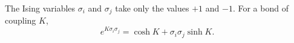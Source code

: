 \documentclass{article}
\begin{document}
The Ising variables $\sigma_i$ and $\sigma_j$ take only the values $+1$ and $-1$. For a bond of coupling $K$,
\begin{equation}
e^{K\sigma_i\sigma_j} = \cosh K + \sigma_i\sigma_j \sinh K .
\label{eq:ht}
\end{equation}
\end{document}
